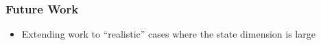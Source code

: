 \documentclass[9pt]{beamer}
\begin{document}
\begin{frame}
\frametitle{Future Work}
\label{sec-3-4}

\begin{itemize}
\item Extending work to ``realistic'' cases where the state dimension is large
\end{itemize}
\end{frame}
\end{document}
